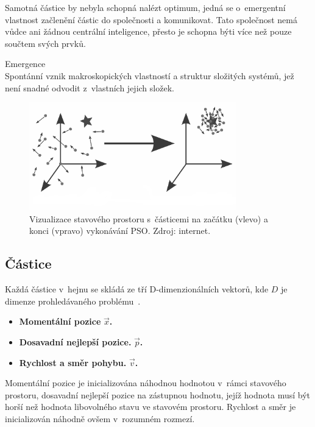 Samotná částice by nebyla schopná nalézt optimum, jedná se o~emergentní vlastnost začlenění částic do společnosti a komunikovat. Tato společnost nemá vůdce ani žádnou centrální inteligence, přesto je schopna býti více než pouze součtem svých prvků.

\begin{definition} {Emergence\\}
Spontánní vznik makroskopických vlastností a struktur složitých systémů, jež není snadné odvodit z~vlastních jejich složek.
\label{def:emergence}
\end{definition}

\begin{figure}[hbt]
	\centering
	\includegraphics[width=0.8\textwidth]{obrazky-figures/pso.png}
	\caption{Vizualizace stavového prostoru s~částicemi na začátku (vlevo) a konci (vpravo) vykonávání PSO. Zdroj: internet.}
	\label{fg:pso_swarm}
\end{figure}

\subsection{Částice}
Každá částice v~hejnu se skládá ze tří D-dimenzionálních vektorů, kde $D$ je dimenze prohledávaného problému~\cite{pso_article}.
\begin{itemize}
    \item \textbf{Momentální pozice} \textbf{$\Vec{x}$.}
    \item \textbf{Dosavadní nejlepší pozice.} \textbf{$\Vec{p}$.}
    \item \textbf{Rychlost a směr pohybu.} \textbf{$\Vec{v}$.}
\end{itemize}
Momentální pozice je inicializována náhodnou hodnotou v~rámci stavového prostoru, dosavadní nejlepší pozice na zástupnou hodnotu, jejíž hodnota musí být horší než hodnota libovolného stavu ve stavovém prostoru. Rychlost a směr je inicializován náhodně ovšem v~rozumném rozmezí.


